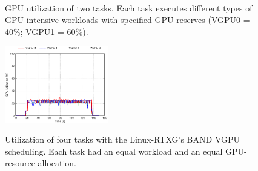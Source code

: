 \begin{figure}[!t]
\begin{minipage}[t]{0.33\hsize}
\begin{center}
\label{fig:band_rtx}
\label{fig:rtx_nouveau}
\end{center}
\end{minipage}
\begin{minipage}[t]{0.33\hsize}
\begin{center}
\label{fig:fifo_gdev} \\
\label{fig:band_gdev}
\label{fig:gdev_usage}
\end{center}
\end{minipage}
\caption{GPU utilization of two tasks. Each task executes different types of GPU-intensive workloads with specified GPU reserves (VGPU0 = 40\%; VGPU1 = 60\%).}
\vspace{-3mm}
\label{fig:utilize}
\end{figure}

\begin{figure}[!t]
\begin{center}
\includegraphics[width=0.4\textwidth]{img/band_rtx_fair}
\caption{Utilization of four tasks with the Linux-RTXG's BAND VGPU scheduling. Each task had an equal workload and an equal GPU-resource allocation.}
\vspace{-8mm}
\label{fig:band_rtx_fair}
\end{center}
\end{figure}


